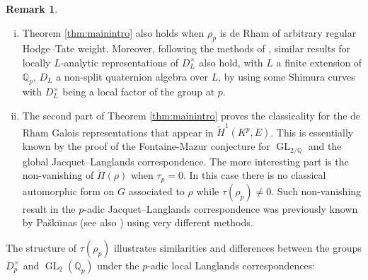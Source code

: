 \documentclass{article}
\theoremstyle{definition}
\newtheorem{remark}[theorem]{Remark}
\def\bbQ{\mathbb{Q}}
\DeclareMathOperator{\GL}{GL}
\begin{document}
\begin{remark}
\begin{enumerate}[(i)]
    \item Theorem \ref{thm:mainintro} also holds when $\rho_p$ is de Rham of arbitrary regular Hodge--Tate weight. Moreover, following the methods of \cite{QS24}, similar results for locally $L$-analytic representations of $D_L^\times$ also hold, with $L$ a finite extension of $\bbQ_p$, $D_L$ a non-split quaternion algebra over $L$, by using some Shimura curves with $D_L^\times$ being a local factor of the group at $p$.
    \item The second part of Theorem \ref{thm:mainintro} proves the classicality for the de Rham Galois representations that appear in $\widetilde{H}^1(K^p,E)$. This is essentially known by the proof of the Fontaine-Mazur conjecture for $\GL_{2/\bbQ}$ \cite{emerton2011local,PanII} and the global Jacquet--Langlands correspondence. The more interesting part is the non-vanishing of $\check{\Pi}(\rho)$ when $\tau_p=0$. In this case there is no classical automorphic form on $G$ associated to $\rho$ while $\tau(\rho_p)\neq 0$. Such non-vanishing result in the $p$-adic Jacquet--Langlands correspondence was previously known by Pa{\v{s}}k{\=u}nas \cite[Theorem 1.4]{pavskunas2022some} (see also \cite[\S 1.3]{Howe2022SpectralPadicJacquetLanglands}) using very different methods.
\end{enumerate}
\end{remark}
The structure of $\tau(\rho_p)$ illustrates similarities and differences between the groups $D_p^{\times}$ and $\GL_2(\bbQ_p)$ under the $p$-adic local Langlands correspondences:
\end{document}
